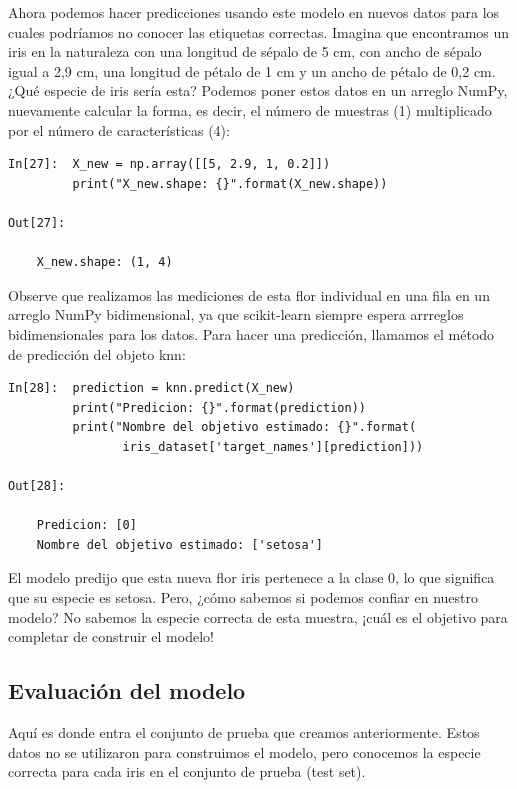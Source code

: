 Ahora podemos hacer predicciones usando este modelo en nuevos datos para los cuales podríamos no conocer las etiquetas correctas. Imagina que encontramos un iris en la naturaleza con una longitud de sépalo de 5 cm, con  ancho de sépalo igual a 2,9 cm, una longitud de pétalo de 1 cm y un ancho de pétalo de 0,2 cm. ¿Qué especie de iris sería esta? Podemos poner estos datos en un arreglo  NumPy,  nuevamente  calcular la forma, es decir, el número de muestras (1) multiplicado por el número de características (4):\\

\begin{lstlisting}
In[27]:  X_new = np.array([[5, 2.9, 1, 0.2]])
         print("X_new.shape: {}".format(X_new.shape))

Out[27]:

    X_new.shape: (1, 4)
\end{lstlisting}



Observe  que realizamos las mediciones de esta flor individual en una fila en un arreglo NumPy bidimensional, ya que {\ttfamily scikit-learn}  siempre espera arrreglos bidimensionales para los datos.
Para hacer una predicción, llamamos el método de predicción del objeto knn:\\

\begin{lstlisting}
In[28]:  prediction = knn.predict(X_new)
         print("Predicion: {}".format(prediction))
         print("Nombre del objetivo estimado: {}".format(
                iris_dataset['target_names'][prediction]))

Out[28]:

    Predicion: [0]
    Nombre del objetivo estimado: ['setosa']
\end{lstlisting}


El modelo predijo que esta nueva flor iris pertenece a la clase 0, lo que significa que su especie es setosa.  Pero, ¿cómo sabemos si podemos confiar en nuestro modelo?  No sabemos la especie correcta de esta muestra, ¡cuál es el objetivo para completar de construir el modelo!


\subsection{Evaluación del modelo}

Aquí es donde entra el conjunto de prueba que creamos anteriormente. Estos datos no se utilizaron para construimos el modelo, pero conocemos la especie correcta para cada iris en el conjunto de prueba (test set).

